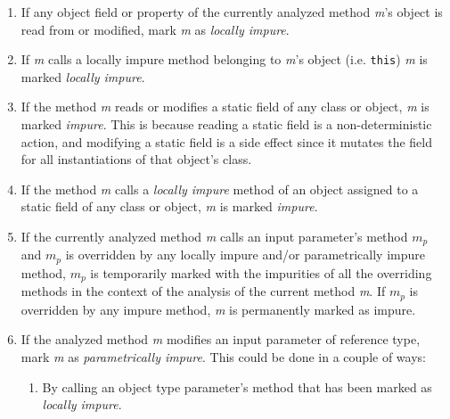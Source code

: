 \documentclass[a4paper,12pt]{article}
\begin{document}
\begin{enumerate}
  \item If any object field or property of the currently analyzed method \textit{m}'s object is read from or modified, mark \textit{m} as \textit{locally impure}. \label{itm:locally-impure}
  \item If \textit{m} calls a locally impure method belonging to \textit{m}'s object (i.e. \texttt{this}) \textit{m} is marked \textit{locally impure}.
  \item If the method \textit{m} reads or modifies a static field of any class or object, \textit{m} is marked \textit{impure}. This is because reading a static field is a non-deterministic action, and modifying a static field is a side effect since it mutates the field for all instantiations of that object's class. \label{itm:static-impure}
  \item If the method \textit{m} calls a \textit{locally impure} method of an object assigned to a static field of any class or object, \textit{m} is marked \textit{impure}.
  \item If the currently analyzed method \textit{m} calls an input parameter's method $m_p$ and $m_p$ is overridden by any locally impure and/or parametrically impure method, $m_p$ is temporarily marked with the impurities of all the overriding methods in the context of the analysis of the current method \textit{m}. If $m_p$ is overridden by any impure method, \textit{m} is permanently marked as impure.
  \item If the analyzed method \textit{m} modifies an input parameter of reference type, mark \textit{m} as \textit{parametrically impure}. This could be done in a couple of ways: \label{itm:parametrically-impure}
    \begin{enumerate}
      \item By calling an object type parameter's method that has been marked as \textit{locally impure}. \label{itm:parametrically-impure-sub1}

\end{enumerate}
\end{enumerate}
\end{document}
